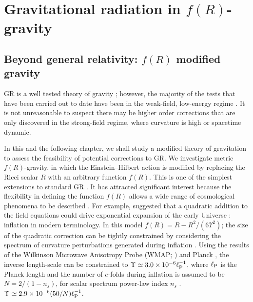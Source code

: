 \chapter{Gravitational radiation in $f(R)$-gravity}\label{ch:f-R1}

\section{Beyond general relativity: $f(R)$ modified gravity}

GR is a well tested theory of gravity \citep{Will2006}; however, the majority of the tests that have been carried out to date have been in the weak-field, low-energy regime \citep{Will1993,Psaltis2008a}. It is not unreasonable to suspect there may be higher order corrections that are only discovered in the strong-field regime, where curvature is high or spacetime dynamic.

In this and the following chapter, we shall study a modified theory of gravitation to assess the feasibility of potential corrections to GR. We investigate metric $f(R)$-gravity, in which the Einstein--Hilbert action is modified by replacing the Ricci scalar $R$ with an arbitrary function $f(R)$. This is one of the simplest extensions to standard GR \citep{Sotiriou2010, DeFelice2010}. It has attracted significant interest because the flexibility in defining the function $f(R)$ allows a wide range of cosmological phenomena to be described \citep{Nojiri2007, Capozziello2007a}. For example, \citet{Starobinsky1980} suggested that a quadratic addition to the field equations could drive exponential expansion of the early Universe \citep{Vilenkin1985}: inflation in modern terminology. In this model $f(R) = R - R^2/(6\Upsilon^2)$; the size of the quadratic correction can be tightly constrained by considering the spectrum of curvature perturbations generated during inflation \citep{Starobinskii1983, Starobinskii1985}. Using the results of the Wilkinson Microwave Anisotropy Probe (WMAP; \citealt{Bennett2012, Hinshaw2012}) and Planck \citep{Ade2013a,Ade2013b}, the inverse length-scale can be constrained to $\Upsilon \simeq 3.0 \times 10^{-6} \ell_\mathrm{P}^{-1}$, where $\ell_\mathrm{P}$ is the Planck length and the number of $e$-folds during inflation is assumed to be $N = 2/(1 - n_s)$, for scalar spectrum power-law index $n_s$ \citep{Starobinsky2007, DeFelice2010}. $\Upsilon \simeq 2.9 \times 10^{-6} (50/N) \ell_\mathrm{P}^{-1}$. %


